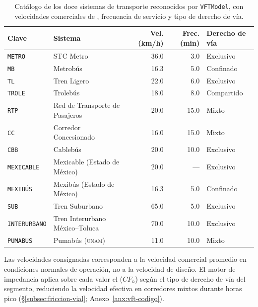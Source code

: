 \begin{table}[H]
    \centering
    \small
    \caption[Catálogo de sistemas de transporte en \texttt{VFTModel}]{Catálogo de los
    doce sistemas de transporte reconocidos por \texttt{VFTModel}, con velocidades
    comerciales de , frecuencia de servicio y tipo de derecho
    de vía.
    }
    \label{tab:vft-sistemas}
    \begin{tabular}{|l|l|r|r|l|}
        \hline
        \textbf{Clave} & \textbf{Sistema} &
        \textbf{Vel. (km/h)} & \textbf{Frec. (min)} &
        \textbf{Derecho de vía} \\
        \hline
        \texttt{METRO}       & STC Metro                        & 36.0 &  3.0 & Exclusivo  \\
        \texttt{MB}          & Metrobús                         & 16.3 &  5.0 & Confinado  \\
        \texttt{TL}          & Tren Ligero                      & 22.0 &  6.0 & Exclusivo  \\
        \texttt{TROLE}       & Trolebús                         & 18.0 &  8.0 & Compartido \\
        \texttt{RTP}         & Red de Transporte de Pasajeros   & 20.0 & 15.0 & Mixto      \\
        \texttt{CC}          & Corredor Concesionado            & 16.0 & 15.0 & Mixto      \\
        \texttt{CBB}         & Cablebús                         & 20.0 & 10.0 & Exclusivo  \\
        \texttt{MEXICABLE}   & Mexicable (Estado de México)     & 20.0 &  —   & Exclusivo  \\
        \texttt{MEXIBÚS}     & Mexibús (Estado de México)       & 16.3 &  5.0 & Confinado  \\
        \texttt{SUB}         & Tren Suburbano                   & 65.0 &  5.0 & Exclusivo  \\
        \texttt{INTERURBANO} & Tren Interurbano México--Toluca  & 70.0 & 10.0 & Exclusivo  \\
        \texttt{PUMABUS}     & Pumabús (\textsc{unam})          & 11.0 & 10.0 & Mixto      \\
        \hline
    \end{tabular}
\end{table}

Las velocidades consignadas corresponden a la velocidad comercial promedio en
condiciones normales de operación, no a la velocidad de diseño. El motor de
impedancia aplica sobre cada valor el 
($CF_h$) según el tipo de derecho de vía del segmento, reduciendo la velocidad
efectiva en corredores mixtos durante horas pico (§\ref{subsec:friccion-vial};
Anexo~\ref{anx:vft-codigo}).
